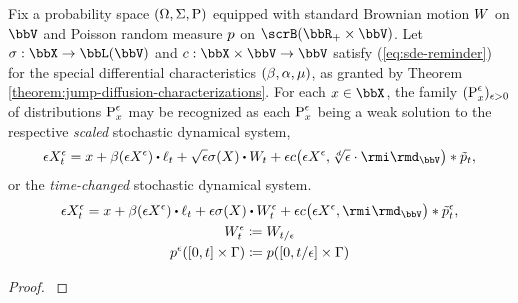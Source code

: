\begin{proposition}
  \label{proposition:sde-asymptotics}
  Fix a probability space $(\Omega, \Sigma, {\operatorname{P}})$ equipped with standard Brownian motion $W$ on $\vecSpace$ and Poisson random measure $p$ on $\scrB(\bbR_+\times\vecSpace)$.
  Let $\affDiffSqrt: \stateSpace \rightarrow \bbL(\vecSpace)$ and $\thinner: \stateSpace \times \vecSpace \rightarrow \vecSpace$ satisfy (\ref{eq:sde-reminder}) for the special differential characteristics $(\beta, \alpha, \mu)$, as granted by Theorem \ref{theorem:jump-diffusion-characterizations}.
  For each $\stateVar \in \stateSpace$, the family $({\operatorname{P}}^\epsilon_x)_{\epsilon>0}$ of distributions ${\operatorname{P}}^\epsilon_x$ may be recognized as each ${\operatorname{P}}^\epsilon_x$ being a weak solution to the respective \emph{scaled} stochastic dynamical system,
  \begin{equation*}
    \Xe_t = \stateVar + \affDrift(\Xe) \shortInt \leb_t + \sqrt\epsilon \affDiffSqrt(\X) \shortInt \W_t + \epsilon\thinner\big(\Xe, \sqrt[d]{\epsilon} \cdot \id_\vecSpace\big) \ast \compensate{\poisRM}_t,
  \end{equation*}
  or the \emph{time-changed} stochastic dynamical system.
  \begin{gather*}
    \Xe_t = \stateVar + \affDrift(\Xe) \shortInt \leb_t + \epsilon \affDiffSqrt(\X) \shortInt \W^\epsilon_t + \epsilon\thinner\big(\Xe, \id_\vecSpace\big) \ast \compensate{\poisRM^\epsilon}_t, \\
    \W^\epsilon_t \defeq \W_{t/\epsilon} \\
    \poisRM^\epsilon([0,t]\times \Gamma) \defeq \poisRM([0,t/\epsilon] \times \Gamma)
  \end{gather*}
\end{proposition}
\begin{proof}
  \label{proof:proposition:sde-asymptotics}
\end{proof}
